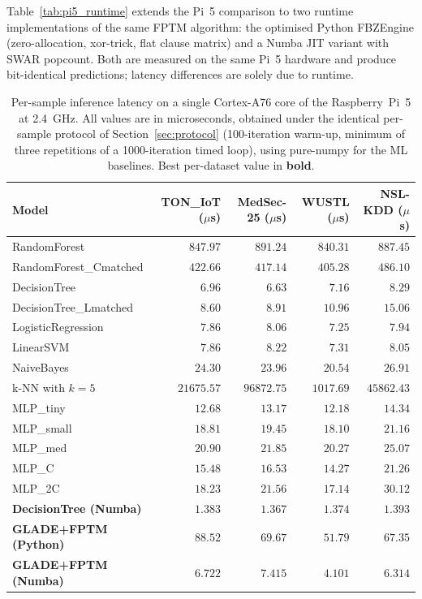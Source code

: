\documentclass[journal,10pt]{IEEEtran}
\begin{document}
Table~\ref{tab:pi5_runtime} extends the Pi~5 comparison to two runtime
implementations of the same FPTM algorithm: the optimised
Python FBZEngine (zero-allocation, xor-trick, flat clause matrix) and a
Numba JIT variant with SWAR popcount. Both are measured on the same Pi~5
hardware and produce bit-identical predictions; latency differences are
solely due to runtime.

\begin{table}[t]
\centering\small
\caption{Per-sample inference latency on a single Cortex-A76 core of
         the Raspberry~Pi~5 at 2.4~GHz. All values are in
         microseconds, obtained under the identical per-sample
         protocol of Section~\ref{sec:protocol} (100-iteration
         warm-up, minimum of three repetitions of a 1000-iteration
         timed loop), using pure-numpy for the ML baselines.
         Best per-dataset value in \textbf{bold}.}
\label{tab:full_latency}
\begin{tabular}{lrrrr}
\toprule
\textbf{Model} & \textbf{TON\_IoT ($\mu$s)} & \textbf{MedSec-25 ($\mu$s)} & \textbf{WUSTL ($\mu$s)} & \textbf{NSL-KDD ($\mu$s)} \\
\midrule
RandomForest                 & $847.97$   & $891.24$   & $840.31$  & $887.45$  \\
RandomForest\_Cmatched       & $422.66$   & $417.14$   & $405.28$  & $486.10$  \\
DecisionTree                 & $6.96$     & $6.63$     & $7.16$    & $8.29$    \\
DecisionTree\_Lmatched       & $8.60$     & $8.91$     & $10.96$   & $15.06$   \\
LogisticRegression           & $7.86$     & $8.06$     & $7.25$    & $7.94$    \\
LinearSVM                    & $7.86$     & $8.22$     & $7.31$    & $8.05$    \\
NaiveBayes                   & $24.30$    & $23.96$    & $20.54$   & $26.91$   \\
k-NN with $k=5$              & $21675.57$ & $96872.75$ & $1017.69$ & $45862.43$\\
MLP\_tiny                    & $12.68$    & $13.17$    & $12.18$   & $14.34$   \\
MLP\_small                   & $18.81$    & $19.45$    & $18.10$   & $21.16$   \\
MLP\_med                     & $20.90$    & $21.85$    & $20.27$   & $25.07$   \\
MLP\_C                       & $15.48$    & $16.53$    & $14.27$   & $21.26$   \\
MLP\_2C                      & $18.23$    & $21.56$    & $17.14$   & $30.12$   \\
\midrule
\textbf{DecisionTree (Numba)}        & $\mathbf{1.383}$ & $\mathbf{1.367}$ & $\mathbf{1.374}$ & $\mathbf{1.393}$ \\
\midrule
\textbf{GLADE+FPTM (Python)} & $88.52$    & $69.67$    & $51.79$   & $67.35$   \\
\textbf{GLADE+FPTM (Numba)}  & $\mathbf{6.722}$ & $\mathbf{7.415}$ & $\mathbf{4.101}$ & $\mathbf{6.314}$ \\
\bottomrule
\end{tabular}
\end{table}
\end{document}
